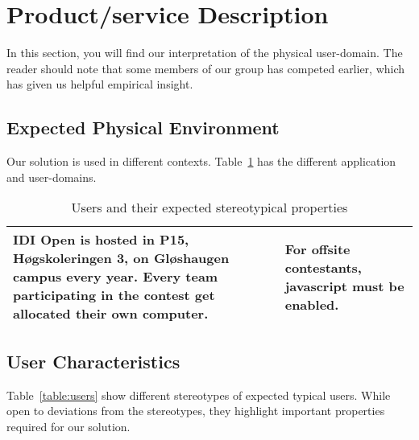 \section{Product/service Description}
In this section, you will find our interpretation of the physical user-domain.
The reader should note that some members of our group has competed earlier,
which has given us helpful empirical insight.

\subsection{Expected Physical Environment}
Our solution is used in different contexts. Table~\ref{table:userChar} has the
different application and user-domains.

\begin{longtable}{|m{3.1712599in}|m{3.1712599in}|}
    \caption{Users and their expected stereotypical properties} \label{table:userChar} \\
\hline
IDI Open is hosted in P15, Høgskoleringen 3, on
Gløshaugen campus every year. Every team participating in the
contest get allocated their own computer. &
For offsite contestants, javascript must be enabled.\\
\hline
\end{longtable}

\pagebreak
\subsection{User Characteristics}
Table~\ref{table:users} show different stereotypes of expected typical users.
While open to deviations from the stereotypes, they highlight important
properties required for our solution.

